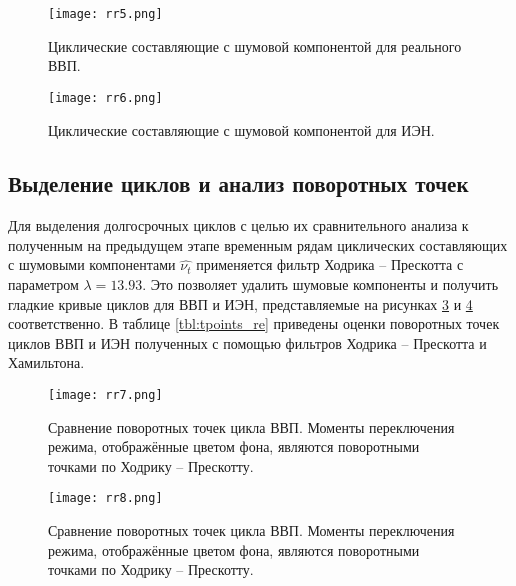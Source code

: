 \documentclass[a4paper,14pt]{extreport}
\begin{document}
	\begin{figure}
		\texttt{[image: rr5.png]}
		\caption{
			Циклические составляющие с шумовой компонентой для реального ВВП.
		}
		\label{fig:rr5}
	\end{figure}	
	
	\begin{figure}
		\texttt{[image: rr6.png]}
		\caption{
			Циклические составляющие с шумовой компонентой для ИЭН.
		}
		\label{fig:rr6}
	\end{figure}	

	\subsection{Выделение циклов и анализ поворотных точек}
	
	Для выделения долгосрочных циклов с целью их сравнительного анализа к полученным на предыдущем этапе временным рядам  циклических составляющих с шумовыми компонентами $\hat{\nu_t}$ применяется фильтр Ходрика -- Прескотта с параметром  $\lambda=13.93$. Это позволяет удалить шумовые компоненты и получить гладкие кривые циклов для ВВП и ИЭН, представляемые на рисунках \ref{fig:rr7} и \ref{fig:rr8} соответственно. 
	В таблице \ref{tbl:tpoints_re} приведены оценки поворотных точек циклов ВВП и ИЭН полученных с помощью фильтров Ходрика -- Прескотта и Хамильтона. 
	
	
	\begin{figure}
		\texttt{[image: rr7.png]}
		\caption{
			Сравнение поворотных точек цикла ВВП. Моменты переключения режима, отображённые цветом фона, являются поворотными точками по Ходрику -- Прескотту. 
		}
		\label{fig:rr7}
	\end{figure}	
	
	\begin{figure}
		\texttt{[image: rr8.png]}
		\caption{
			Сравнение поворотных точек цикла ВВП. Моменты переключения режима, отображённые цветом фона, являются поворотными точками по Ходрику -- Прескотту.
		}
		\label{fig:rr8}
	\end{figure}	
	
\end{document}
